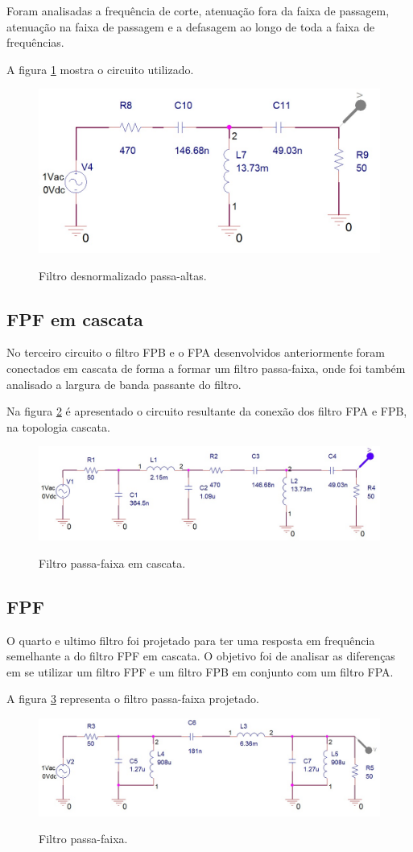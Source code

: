 Foram analisadas a frequência de corte, atenuação fora da faixa de passagem, atenuação na faixa de passagem e a defasagem ao longo de toda a faixa de frequências.

A figura \ref{fFPA} mostra o circuito utilizado.\begin{figure}[H]
\centering
\includegraphics[scale=0.5]{Imagens/fpa.jpg}
\label{fFPA}
\caption{Filtro desnormalizado passa-altas.}
\end{figure}

\subsection{FPF em cascata}
No terceiro circuito o filtro FPB e o FPA desenvolvidos anteriormente foram conectados em cascata de forma a formar um filtro passa-faixa, onde foi também analisado a largura de banda passante do filtro.

Na figura \ref{fFPFC} é apresentado o circuito resultante da conexão dos filtro FPA e FPB, na topologia cascata.

\begin{figure}[H]
\centering
\includegraphics[scale=0.5]{Imagens/fpf1.jpg}
\label{fFPFC}
\caption{Filtro passa-faixa em cascata.}
\end{figure}

\subsection{FPF}
O quarto e ultimo filtro foi projetado para ter uma resposta em frequência semelhante a do filtro FPF em cascata. O objetivo foi de analisar as diferenças em se utilizar um filtro FPF e um filtro FPB em conjunto com um filtro FPA.

A figura \ref{fFPF} representa o filtro passa-faixa projetado.

\begin{figure}[H]
\centering
\includegraphics[scale=0.5]{Imagens/fpf2.jpg}
\label{fFPF}
\caption{Filtro passa-faixa.}
\end{figure}